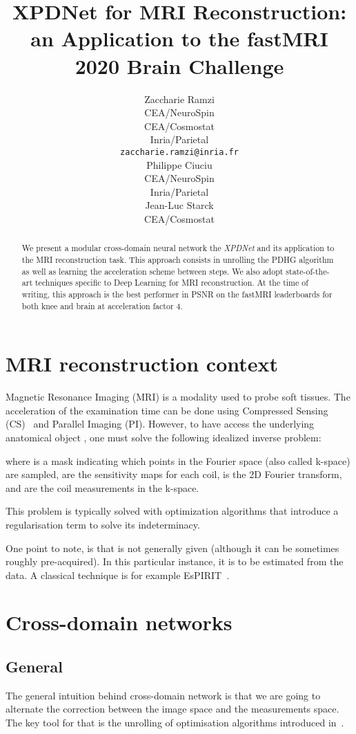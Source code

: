 \documentclass{article}
\title{XPDNet for MRI Reconstruction: an Application to the fastMRI 2020 Brain Challenge}
\author{Zaccharie Ramzi \\
  CEA/NeuroSpin\\
  CEA/Cosmostat\\
  Inria/Parietal\\
  \texttt{zaccharie.ramzi@inria.fr} \\
\And
   Philippe Ciuciu \\
   CEA/NeuroSpin\\
   Inria/Parietal\\
   \AND
   Jean-Luc Starck \\
   CEA/Cosmostat\\
}
\begin{document}
\maketitle

\begin{abstract}
  We present a modular cross-domain neural network the \emph{XPDNet} and its application to the MRI reconstruction task. This approach consists in unrolling the PDHG algorithm as well as learning the acceleration scheme between steps. We also adopt state-of-the-art techniques specific to Deep Learning for MRI reconstruction. At the time of writing, this approach is the best performer in PSNR on the fastMRI leaderboards for both knee and brain at acceleration factor 4.
\end{abstract}

\section{MRI reconstruction context}

Magnetic Resonance Imaging (MRI) is a modality used to probe soft tissues.
The acceleration of the examination time can be done using Compressed Sensing (CS)~\citep{Lustig2007} and Parallel Imaging (PI).
However, to have access the underlying anatomical object , one must solve the following idealized inverse problem:

where  is a mask indicating which points in the Fourier space (also called k-space) are sampled,  are the sensitivity maps for each coil,  is the 2D Fourier transform, and  are the coil measurements in the k-space.

This problem is typically solved with optimization algorithms that introduce a regularisation term to solve its indeterminacy.

One point to note, is that  is not generally given (although it can be sometimes roughly pre-acquired). 
In this particular instance, it is to be estimated from the data.
A classical technique is for example EsPIRIT~\citep{Uecker2014ESPIRiT-AnAccess}.

\section{Cross-domain networks}
\subsection{General}
The general intuition behind cross-domain network is that we are going to alternate the correction between the image space and the measurements space.
The key tool for that is the unrolling of optimisation algorithms introduced in~\citep{Gregor2010}.
\end{document}
